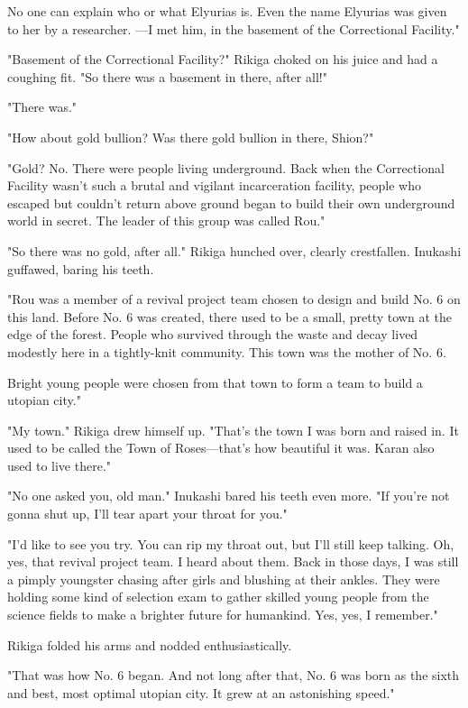No one can explain who or what Elyurias is. Even the name Elyurias was
given to her by a researcher. ---I met him, in the basement of the
Correctional Facility."

"Basement of the Correctional Facility?" Rikiga choked on his juice and
had a coughing fit. "So there was a basement in there, after all!"

"There was."

"How about gold bullion? Was there gold bullion in there, Shion?"

"Gold? No. There were people living underground. Back when the
Correctional Facility wasn't such a brutal and vigilant incarceration
facility, people who escaped but couldn't return above ground began to
build their own underground world in secret. The leader of this group
was called Rou."

"\el So there was no gold, after all." Rikiga hunched over, clearly
crestfallen. Inukashi guffawed, baring his teeth.

"Rou was a member of a revival project team chosen to design and build
No. 6 on this land. Before No. 6 was created, there used to be a small,
pretty town at the edge of the forest. People who survived through the
waste and decay lived modestly here in a tightly-knit community. This
town was the mother of No. 6.

Bright young people were chosen from that town to form a team to build a
utopian city."

"My town." Rikiga drew himself up. "That's the town I was born and
raised in. It used to be called the Town of Roses---that's how beautiful
it was. Karan also used to live there."

"No one asked you, old man." Inukashi bared his teeth even more. "If
you're not gonna shut up, I'll tear apart your throat for you."

"I'd like to see you try. You can rip my throat out, but I'll still keep
talking. Oh, yes, that revival project team. I heard about them. Back in
those days, I was still a pimply youngster chasing after girls and
blushing at their ankles. They were holding some kind of selection exam
to gather skilled young people from the science fields to make a
brighter future for humankind. Yes, yes, I remember."

Rikiga folded his arms and nodded enthusiastically.

"That was how No. 6 began. And not long after that, No. 6 was born as
the sixth and best, most optimal utopian city. It grew at an astonishing
speed."

